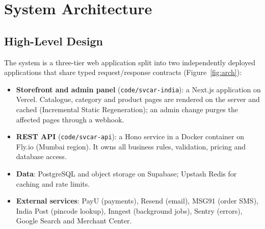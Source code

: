 \documentclass{tietreport}
\begin{document}
\section{System Architecture}

\subsection{High-Level Design}

The system is a three-tier web application split into two independently
deployed applications that share typed request/response contracts
(Figure~\ref{fig:arch}):

\begin{itemize}
  \item \textbf{Storefront and admin panel} (\texttt{code/svcar-india}):
        a Next.js application on Vercel. Catalogue, category and product
        pages are rendered on the server and cached (Incremental Static
        Regeneration); an admin change purges the affected pages through a
        webhook.
  \item \textbf{REST API} (\texttt{code/svcar-api}): a Hono service in a
        Docker container on Fly.io (Mumbai region). It owns all business
        rules, validation, pricing and database access.
  \item \textbf{Data}: PostgreSQL and object storage on Supabase; Upstash
        Redis for caching and rate limits.
  \item \textbf{External services}: PayU (payments), Resend (email), MSG91
        (order SMS), India Post (pincode lookup), Inngest (background jobs),
        Sentry (errors), Google Search and Merchant Center.
\end{itemize}
\end{document}
